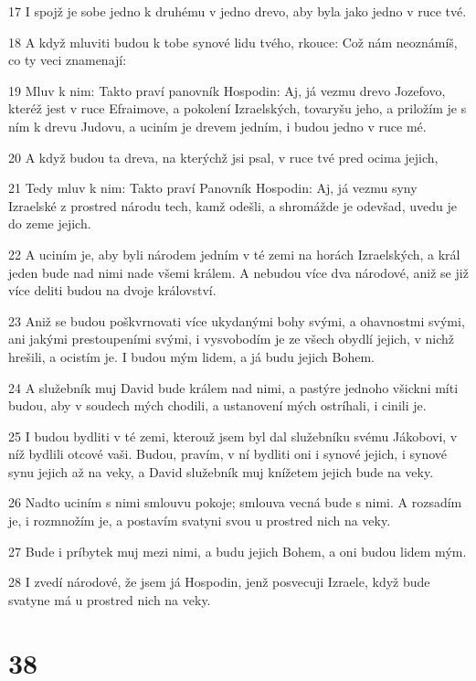 \par 17 I spojž je sobe jedno k druhému v jedno drevo, aby byla jako jedno v ruce tvé.
\par 18 A když mluviti budou k tobe synové lidu tvého, rkouce: Což nám neoznámíš, co ty veci znamenají:
\par 19 Mluv k nim: Takto praví panovník Hospodin: Aj, já vezmu drevo Jozefovo, kteréž jest v ruce Efraimove, a pokolení Izraelských, tovaryšu jeho, a priložím je s ním k drevu Judovu, a uciním je drevem jedním, i budou jedno v ruce mé.
\par 20 A když budou ta dreva, na kterýchž jsi psal, v ruce tvé pred ocima jejich,
\par 21 Tedy mluv k nim: Takto praví Panovník Hospodin: Aj, já vezmu syny Izraelské z prostred národu tech, kamž odešli, a shromážde je odevšad, uvedu je do zeme jejich.
\par 22 A uciním je, aby byli národem jedním v té zemi na horách Izraelských, a král jeden bude nad nimi nade všemi králem. A nebudou více dva národové, aniž se již více deliti budou na dvoje království.
\par 23 Aniž se budou poškvrnovati více ukydanými bohy svými, a ohavnostmi svými, ani jakými prestoupeními svými, i vysvobodím je ze všech obydlí jejich, v nichž hrešili, a ocistím je. I budou mým lidem, a já budu jejich Bohem.
\par 24 A služebník muj David bude králem nad nimi, a pastýre jednoho všickni míti budou, aby v soudech mých chodili, a ustanovení mých ostríhali, i cinili je.
\par 25 I budou bydliti v té zemi, kterouž jsem byl dal služebníku svému Jákobovi, v níž bydlili otcové vaši. Budou, pravím, v ní bydliti oni i synové jejich, i synové synu jejich až na veky, a David služebník muj knížetem jejich bude na veky.
\par 26 Nadto uciním s nimi smlouvu pokoje; smlouva vecná bude s nimi. A rozsadím je, i rozmnožím je, a postavím svatyni svou u prostred nich na veky.
\par 27 Bude i príbytek muj mezi nimi, a budu jejich Bohem, a oni budou lidem mým.
\par 28 I zvedí národové, že jsem já Hospodin, jenž posvecuji Izraele, když bude svatyne má u prostred nich na veky.

\chapter{38}

